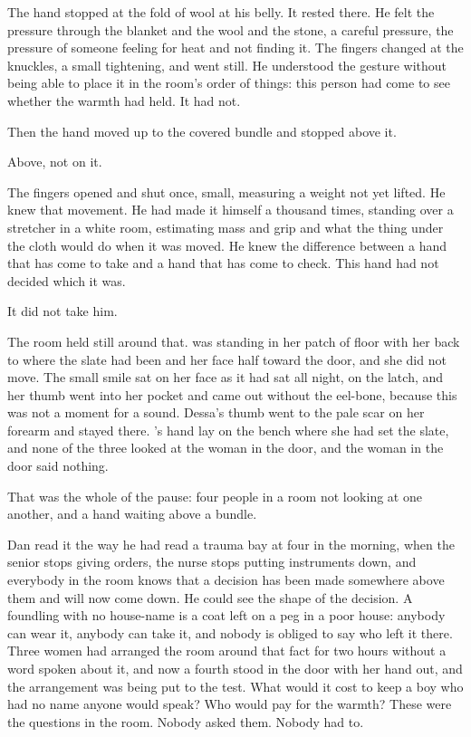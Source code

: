 The hand stopped at the fold of wool at his belly. It rested there. He felt the pressure through the blanket and the wool and the stone, a careful pressure, the pressure of someone feeling for heat and not finding it. The fingers changed at the knuckles, a small tightening, and went still. He understood the gesture without being able to place it in the room's order of things: this person had come to see whether the warmth had held. It had not.

Then the hand moved up to the covered bundle and stopped above it.

Above, not on it.

The fingers opened and shut once, small, measuring a weight not yet lifted. He knew that movement. He had made it himself a thousand times, standing over a stretcher in a white room, estimating mass and grip and what the thing under the cloth would do when it was moved. He knew the difference between a hand that has come to take and a hand that has come to check. This hand had not decided which it was.

It did not take him.

The room held still around that.  was standing in her patch of floor with her back to where the slate had been and her face half toward the door, and she did not move. The small smile sat on her face as it had sat all night, on the latch, and her thumb went into her pocket and came out without the eel-bone, because this was not a moment for a sound. Dessa's thumb went to the pale scar on her forearm and stayed there. 's hand lay on the bench where she had set the slate, and none of the three looked at the woman in the door, and the woman in the door said nothing.

That was the whole of the pause: four people in a room not looking at one another, and a hand waiting above a bundle.

Dan read it the way he had read a trauma bay at four in the morning, when the senior stops giving orders, the nurse stops putting instruments down, and everybody in the room knows that a decision has been made somewhere above them and will now come down. He could see the shape of the decision. A foundling with no house-name is a coat left on a peg in a poor house: anybody can wear it, anybody can take it, and nobody is obliged to say who left it there. Three women had arranged the room around that fact for two hours without a word spoken about it, and now a fourth stood in the door with her hand out, and the arrangement was being put to the test. What would it cost to keep a boy who had no name anyone would speak? Who would pay for the warmth? These were the questions in the room. Nobody asked them. Nobody had to.

